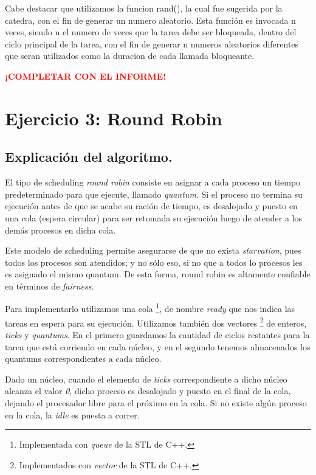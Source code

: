 \documentclass[a4paper]{article}
\begin{document}
 Cabe destacar que utilizamos la funcion rand(), la cual fue sugerida por la
 catedra, con el fin de generar un numero aleatorio.
 Esta funci\'on es invocada n veces, siendo n el numero de veces que la
 tarea debe ser bloqueada, dentro del ciclo principal de la tarea, con el
 fin de generar n numeros aleatorios diferentes que seran utilizados como la
 duracion de cada llamada bloqueante.




\textbf{\textcolor{red}{¡COMPLETAR CON EL INFORME!}}

\section{Ejercicio 3: Round Robin}

\subsection{Explicación del algoritmo.}
El tipo de scheduling \textit{round robin} consiste en asignar a cada proceso un
tiempo predeterminado para que ejecute, llamado \textit{quantum}. Si el proceso no termina su ejecución antes de que se
acabe su ración de tiempo, es desalojado y puesto en una cola (espera
circular) para ser retomada su ejecución luego de atender a los demás
procesos en dicha cola.

Este modelo de scheduling permite asegurarse de que no exista
\textit{starvation}, pues todos los procesos son atendidos; y no sólo eso,
si no que a todos lo procesos les es asignado el mismo quantum. De esta
forma, round robin es altamente confiable en términos de \textit{fairness}.

Para implementarlo utilizamos una cola \footnote{Implementada con
\textit{queue} de la STL de C++.}, de nombre
\textit{ready} que nos indica las tareas en espera para su ejecución.
Utilizamos también dos vectores \footnote{Implementados con
\textit{vector} de la STL de C++.} de enteros, \textit{ticks} y
\textit{quantums}. En el primero guardamos la cantidad de ciclos restantes
para la tarea que está corriendo en cada núcleo, y en el segundo tenemos
almacenados los quantums correspondientes a cada núcleo. 

Dado un núcleo, cuando el elemento de \textit{ticks} correspondiente a dicho
núcleo alcanza el valor \textit{0}, dicho proceso es desalojado y puesto en
el final de la cola, dejando el procesador libre para el próximo en la cola.
Si no existe algún proceso en la cola, la \textit{idle} es puesta a correr.
\end{document}
